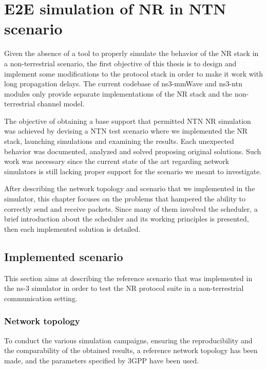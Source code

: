 
\chapter{E2E simulation of NR in NTN scenario}
\label{chp:scheduling_problems}

Given the absence of a tool to properly simulate the behavior of the \ac{NR} stack in a non-terrestrial scenario, the first objective of this thesis is to design and implement some modifications to the protocol stack in order to make it work with long propagation delays. The current codebase of ns3-mmWave and ns3-ntn modules only provide separate implementations of the \ac{NR} stack and the non-terrestrial channel model.

The objective of obtaining a base support that permitted \ac{NTN} \ac{NR} simulation was achieved by devising a \ac{NTN} test scenario where we implemented the \ac{NR} stack, launching simulations and examining the results. Each unexpected behavior was documented, analyzed and solved proposing original solutions. Such work was necessary since the current state of the art regarding network simulators is still lacking proper support for the scenario we meant to investigate.

After describing the network topology and scenario that we implemented in the simulator, this chapter focuses on the problems that hampered the ability to correctly send and receive packets. Since many of them involved the scheduler, a brief introduction about the scheduler and its working principles is presented, then each implemented solution is detailed.

\section{Implemented scenario}

This section aims at describing the reference scenario that was implemented in the ns-3 simulator in order to test the \ac{NR} protocol suite in a non-terrestrial communication setting.

\subsection{Network topology}
To conduct the various simulation campaigns, ensuring the reproducibility and the comparability of the obtained results, a reference network topology has been made, and the parameters specified by \ac{3GPP} have been used.

